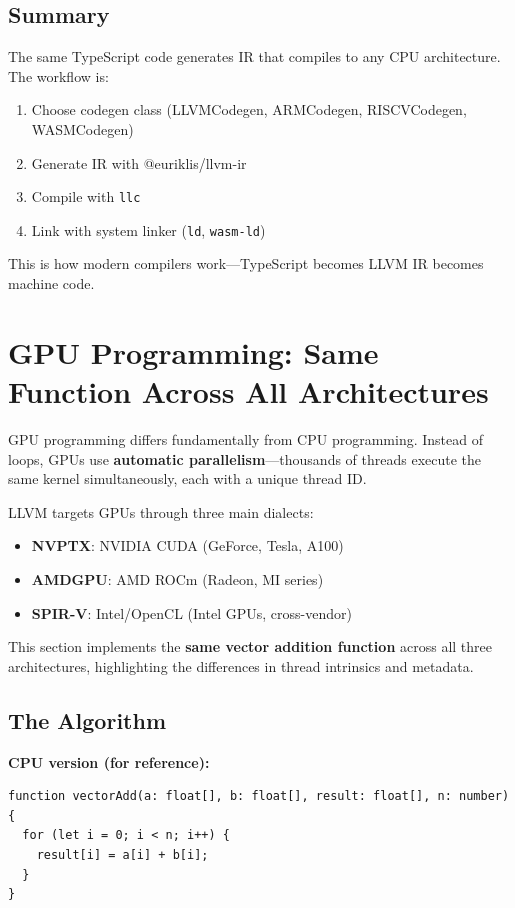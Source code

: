 \documentclass[11pt]{article}
\begin{document}
\subsection{Summary}

The same TypeScript code generates IR that compiles to any CPU architecture. The workflow is:

\begin{enumerate}[noitemsep]
  \item Choose codegen class (LLVMCodegen, ARMCodegen, RISCVCodegen, WASMCodegen)
  \item Generate IR with @euriklis/llvm-ir
  \item Compile with \texttt{llc}
  \item Link with system linker (\texttt{ld}, \texttt{wasm-ld})
\end{enumerate}

This is how modern compilers work—TypeScript becomes LLVM IR becomes machine code.

\section{GPU Programming: Same Function Across All Architectures}

GPU programming differs fundamentally from CPU programming. Instead of loops, GPUs use \textbf{automatic parallelism}—thousands of threads execute the same kernel simultaneously, each with a unique thread ID.

LLVM targets GPUs through three main dialects:
\begin{itemize}[noitemsep]
  \item \textbf{NVPTX}: NVIDIA CUDA (GeForce, Tesla, A100)
  \item \textbf{AMDGPU}: AMD ROCm (Radeon, MI series)
  \item \textbf{SPIR-V}: Intel/OpenCL (Intel GPUs, cross-vendor)
\end{itemize}

This section implements the \textbf{same vector addition function} across all three architectures, highlighting the differences in thread intrinsics and metadata.

\subsection{The Algorithm}

\textbf{CPU version (for reference):}
\begin{lstlisting}[style=ts]
function vectorAdd(a: float[], b: float[], result: float[], n: number) {
  for (let i = 0; i < n; i++) {
    result[i] = a[i] + b[i];
  }
}
\end{lstlisting}
\end{document}
